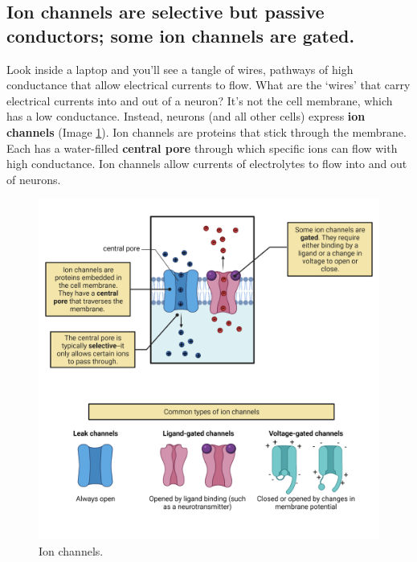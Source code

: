 \documentclass[
]{book}
\begin{document}
\hypertarget{ion-channels-are-selective-but-passive-conductors-some-ion-channels-are-gated.}{%
\subsection{Ion channels are selective but passive conductors; some ion channels are gated.}\label{ion-channels-are-selective-but-passive-conductors-some-ion-channels-are-gated.}}

Look inside a laptop and you'll see a tangle of wires, pathways of high conductance that allow electrical currents to flow. What are the `wires' that carry electrical currents into and out of a neuron? It's not the cell membrane, which has a low conductance. Instead, neurons (and all other cells) express \textbf{ion channels }(Image \ref{fig:ion-channels}). Ion channels are proteins that stick through the membrane. Each has a water-filled \textbf{central pore} through which specific ions can flow with high conductance. Ion channels allow currents of electrolytes to flow into and out of neurons.

\begin{figure}

{\centering \includegraphics[width=0.9\linewidth]{images/ch02/02_18} 

}

\caption{Ion channels.}\label{fig:ion-channels}
\end{figure}
\end{document}
